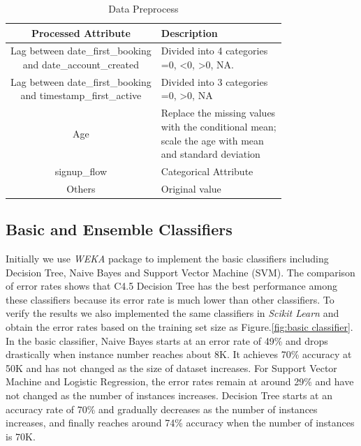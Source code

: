 \documentclass{sig-alternate-05-2015}
\begin{document}
\begin{table}[!htb]
\centering
\caption{Data Preprocess}
\label{table:preprocess}
\begin{tabular}{|c|l|} \hline
Processed Attribute & Description\\ \hline
\shortstack{Lag between date\_first\_booking \\ and date\_account\_created} & 
\shortstack[l]{Divided into 4 categories\: \\ =0, <0, >0, NA.}\\ \hline
\shortstack{Lag between date\_first\_booking \\ and timestamp\_first\_active} & 
\shortstack[l]{Divided into 3 categories\: \\ =0, >0, NA}\\ \hline
Age & 
\shortstack[l]{Replace the missing values \\
with the conditional mean; \\
scale the age with mean \\
and standard deviation} \\ \hline
signup\_flow & Categorical Attribute \\ \hline
Others & Original value \\
\hline\end{tabular}
\end{table}


\subsection{Basic and Ensemble Classifiers}
Initially we use \emph{WEKA} package to implement the basic classifiers including Decision Tree, Naive Bayes and Support Vector Machine (SVM). The comparison of error rates shows that C4.5 Decision Tree has the best performance among these classifiers because its error rate is much lower than other classifiers. To verify the results we also implemented the same classifiers in \emph{Scikit Learn} and obtain the error rates based on the training set size as Figure.\ref{fig:basic classifier}. In the basic classifier, Naive Bayes starts at an error rate of 49\% and drops drastically when instance number reaches about 8K. It achieves 70\% accuracy at 50K and has not changed as the size of dataset increases. For Support Vector Machine and Logistic Regression, the error rates remain at around 29\% and have not changed as the number of instances increases. Decision Tree starts at an accuracy rate of 70\% and gradually decreases as the number of instances increases, and finally reaches around 74\% accuracy when the number of instances is 70K.
\end{document}
